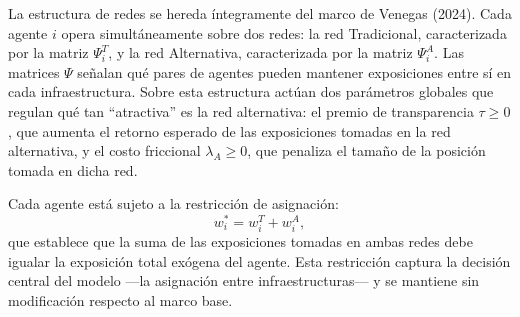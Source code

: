 \documentclass[12pt,a4paper]{article}
\begin{document}
La estructura de redes se hereda íntegramente del marco de Venegas (2024). Cada agente $i$
opera simultáneamente sobre dos redes: la red Tradicional, caracterizada por la matriz
$\Psi_i^T$, y la red Alternativa, caracterizada por la matriz $\Psi_i^A$. Las matrices $\Psi$
señalan qué pares de agentes pueden mantener exposiciones entre sí en cada infraestructura.
Sobre esta estructura actúan dos parámetros globales que regulan qué tan ``atractiva'' es la
red alternativa: el premio de transparencia $\tau \geq 0$, que aumenta el retorno esperado de
las exposiciones tomadas en la red alternativa, y el costo friccional $\lambda_A \geq 0$, que
penaliza el tamaño de la posición tomada en dicha red.

Cada agente está sujeto a la restricción de asignación:
\begin{equation}
    w_i^* = w_i^T + w_i^A,
\end{equation}
que establece que la suma de las exposiciones tomadas en ambas redes debe igualar la
exposición total exógena del agente. Esta restricción captura la decisión central del modelo
—la asignación entre infraestructuras— y se mantiene sin modificación respecto al marco base.
\end{document}
